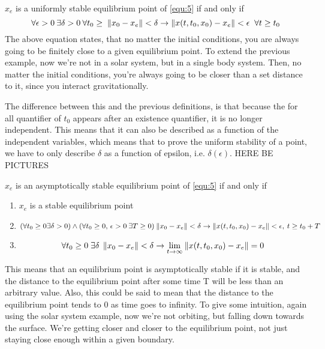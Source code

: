 {
    $x_e$ is a uniformly stable equilibrium point of  \ref{equ:5} if and only if \\
    \begin{equation}
        \label{dfn:ustab_eq_pt}
        \forall \epsilon > 0\: \exists \delta > 0\: \forall t_0 \ge  \; \lVert x_0-x_e\rVert < \delta \rightarrow \lVert x(t,t_0,x_0) - x_e\rVert < \epsilon \;\; \forall t \ge t_0   
    \end{equation}
    The above equation states, that no matter the initial conditions, you are always going to be finitely close to a given equilibrium point.
    To extend the previous example, now we're not in a solar system, but in a single body system. Then, no matter the initial conditions, you're always going to be closer than a set distance to it, since you interact gravitationally.
    
    \nt
    {
    
        The difference between this and the previous definitions, is that because the for all quantifier of $t_0$ appears after an existence quantifier, it is no longer independent. This means that it can also be described as a function of the independent variables, which means that to prove the uniform stability of a point, we have to only describe $\delta$ as a function of epsilon, i.e.  $\delta(\epsilon)$.  
        HERE BE PICTURES
    }


}

{
    $x_e$ is an asymptotically stable equilibrium point of  \ref{equ:5} if and only if \\
    \begin{enumerate}
        \item $x_e$ is a stable equilibrium point
        \item  \begin{equation}
                \label{dfn:astab_eq_pt:1}
                (\forall t_0 \ge 0 \exists  \delta > 0  ) \wedge (\forall t_0\ge 0, \, \epsilon > 0 \: \exists T \ge 0  )\: \lVert x_0-x_e\rVert < \delta \rightarrow \lVert x(t,t_0,x_0)-x_e\rVert < \epsilon, \: t \ge t_0+T
            \end{equation}
        \item  \begin{equation}
                \label{dfn:astab_eq_pt:2}
                \forall t_0\ge 0 \; \exists \delta \: \: \lVert x_0 -x_e\rVert < \delta \rightarrow \lim_{t \to \infty} \: \lVert x(t,t_0,x_0)-x_e\rVert = 0  
            \end{equation}
    \end{enumerate}

   This means that an equilibrium point is asymptotically stable if it is stable, and the distance to the equilibrium point after some time T will be less than an arbitrary value. Also, this could be said to mean that the distance to the equilibrium point tends to 0 as time goes to infinity.
   To give some intuition, again using the solar system example, now we're not orbiting, but falling down towards the surface. We're getting closer and closer to the equilibrium point, not just staying close enough within a given boundary.
}



